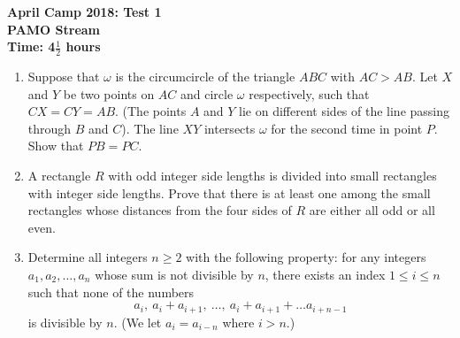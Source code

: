 \documentclass[a4paper,12pt, titlepage]{article}
\begin{document}
\setcounter{page}{1}

\begin{center}
	\textbf{April Camp 2018: Test 1}\\
	\textbf{PAMO Stream}\\
	\textbf{Time: 4$\frac{1}{2}$ hours}
\end{center}

\begin{enumerate}
\vspace{0.2cm}

\item %

Suppose that $\omega$ is the circumcircle of the triangle $ABC$ with $AC>AB$. Let $X$ and $Y$ be two points on $AC$ and circle $\omega$ respectively, such that $CX = CY = AB$. (The points $A$ and $Y$ lie on different sides of the line passing through $B$ and $C$). The line $XY$ intersects $\omega$ for the second time in point $P$. Show that $PB=PC$.


\item %

A rectangle $R$ with odd integer side lengths is divided into small rectangles with integer side lengths. Prove that there is at least one among the small rectangles whose distances from the four sides of $R$ are either all odd or all even.\\

\item %

Determine all integers $n \geq 2$ with the following property: for any integers $a_1, a_2, \dots, a_n$ whose sum is not divisible by $n$, there exists an index $1 \leq i \leq n$ such that none of the numbers $$a_i, \ a_i+a_{i+1}, \ \dots, \ a_i+a_{i+1}+\dots a_{i+n-1}$$ is divisible by $n$. (We let $a_i = a_{i-n}$ where $i>n$.)\\


\end{enumerate}
\end{document}

